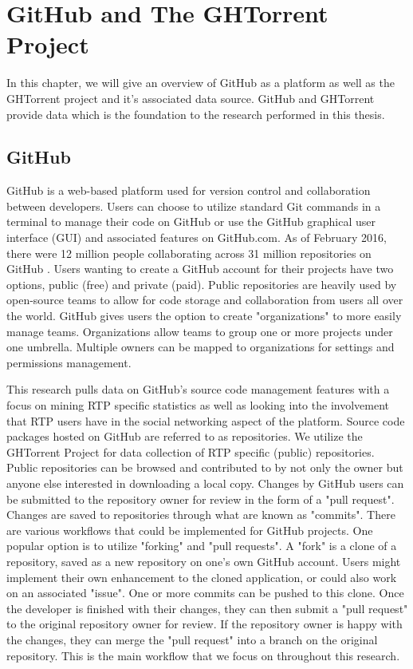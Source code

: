 \chapter{GitHub and The GHTorrent Project}
\label{Chapter:Background}

In this chapter, we will give an overview of GitHub as a platform as well as the GHTorrent project and it's associated data source. GitHub and GHTorrent provide data which is the foundation to the research performed in this thesis.

\section{GitHub}
\label{sec-GitHub}
GitHub is a web-based platform used for version control and collaboration between developers. Users can choose to utilize standard Git commands in a terminal to manage their code on GitHub or use the GitHub graphical user interface (GUI) and associated features on GitHub.com. As of February 2016, there were 12 million people collaborating across 31 million repositories on GitHub \cite{_github_2016}. Users wanting to create a GitHub account for their projects have two options, public (free) and private (paid). Public repositories are heavily used by open-source teams to allow for code storage and collaboration from users all over the world. GitHub gives users the option to create "organizations" to more easily manage teams. Organizations allow teams to group one or more projects under one umbrella. Multiple owners can be mapped to organizations for settings and permissions management. 

This research pulls data on GitHub's source code management features with a focus on mining RTP specific statistics as well as looking into the involvement that RTP users have in the social networking aspect of the platform. Source code packages hosted on GitHub are referred to as repositories. We utilize the GHTorrent Project \cite{gousios_ghtorent_2013} for data collection of RTP specific (public) repositories. Public repositories can be browsed and contributed to by not only the owner but anyone else interested in downloading a local copy. Changes by GitHub users can be submitted to the repository owner for review in the form of a "pull request". Changes are saved to repositories through what are known as "commits". There are various workflows that could be implemented for GitHub projects. One popular option is to utilize "forking" and "pull requests". A "fork" is a clone of a repository, saved as a new repository on one's own GitHub account. Users might implement their own enhancement to the cloned application, or could also work on an associated "issue". One or more commits can be pushed to this clone. Once the developer is finished with their changes, they can then submit a "pull request" to the original repository owner for review. If the repository owner is happy with the changes, they can merge the "pull request" into a branch on the original repository. This is the main workflow that we focus on throughout this research.

